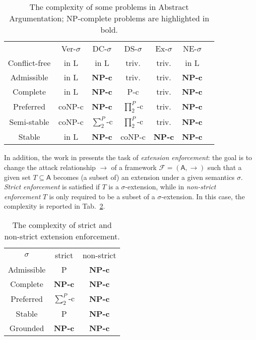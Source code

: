 \documentclass[conference]{IEEEtran}
\newcommand{\F}{\ensuremath{\mathcal{F}}\xspace} %
\newcommand{\args}{\ensuremath{\mathsf{A}}\xspace} %
\newcommand{\atts}{\ensuremath{\rightarrow}\xspace}
\begin{document}
\begin{table}[t]
	\centering
	\footnotesize
	\begin{tabular}{ccccccc}
		&  Ver-$\sigma$ &  DC-$\sigma$ & DS-$\sigma$ & Ex-$\sigma$ &
		NE-$\sigma$  \\
		Conflict-free & in L & in L & triv.& triv. & in L  \\
		Admissible & in L  & \bf{NP-c} & triv. & triv. &  \bf{NP-c}  \\
		Complete & in L &  \bf{NP-c} & P-c & triv. &  \bf{NP-c}  \\
		Preferred & coNP-c &  \bf{NP-c} & $\prod^{P}_{2}$-c& triv. &  \bf{NP-c} \\
		Semi-stable & coNP-c & $\sum^{P}_{2}$-c & $\prod^{P}_{2}$-c & triv. &  \bf{NP-c}  \\
		Stable & in L &  \bf{NP-c} & coNP-c &  \bf{NP-c} &  \bf{NP-c} \\
	\end{tabular}
	\caption{The complexity of some  problems in Abstract Argumentation; NP-complete problems are highlighted in bold.}
	\label{sec:complexity}
	\vspace{-0.5cm}
\end{table}

In addition, the work in \cite{extenf} presents the task of \emph{extension enforcement}: the goal is to change the attack relationship $\atts$ of a framework $\F=(\args,\atts)$ such that a given set $T \subseteq \args$ becomes (a subset of) an extension under a given semantics $\sigma$. \emph{Strict enforcement} is satisfied if $T$ is a $\sigma$-extension, while in \emph{non-strict enforcement} $T$ is only required to be a subset of a $\sigma$-extension. In this case, the complexity is reported in Tab.~\ref{sec:complexity2}.



\begin{table}[t]
	\centering
	\footnotesize
	\begin{tabular}{ccc}
		$\sigma$ &  strict & non-strict  \\
		Admissible & P  & \bf{NP-c}   \\
		Complete & \bf{NP-c} &  \bf{NP-c}  \\
		Preferred & $\sum^{P}_{2}$-c  &  \bf{NP-c}  \\
		Stable &  P & \bf{NP-c}  \\
		Grounded & \bf{NP-c} & \bf{NP-c}
	\end{tabular}
	\caption{The complexity of strict and non-strict extension enforcement.}
	\label{sec:complexity2}
	\vspace{-0.5cm}
\end{table}
\end{document}

